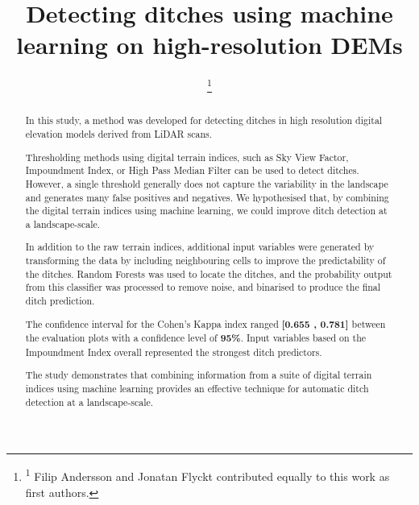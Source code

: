 \documentclass[]{interact}
\theoremstyle{plain}%
\theoremstyle{definition}
\theoremstyle{remark}
\begin{document}
\title{Detecting ditches using machine learning on high-resolution DEMs}

\author{
 
\footnote{\textsuperscript{1} Filip Andersson and Jonatan Flyckt contributed equally to this work as first authors.}}

\maketitle

\begin{abstract}
In this study, a method was developed for detecting ditches in high resolution digital elevation models derived from LiDAR scans.

Thresholding methods using digital terrain indices, such as Sky View Factor, Impoundment Index, or High Pass Median Filter can be used to detect ditches. However, a single threshold generally does not capture the variability in the landscape and generates many false positives and negatives. We hypothesised that, by combining the digital terrain indices using machine learning, we could improve ditch detection at a landscape-scale.

In addition to the raw terrain indices, additional input variables were generated by transforming the data by including neighbouring cells to improve the predictability of the ditches. Random Forests was used to locate the ditches, and the probability output from this classifier was processed to remove noise, and binarised to produce the final ditch prediction.

The confidence interval for the Cohen's Kappa index ranged \textbf{[0.655 , 0.781]} between the evaluation plots with a confidence level of \textbf{95\%}. Input variables based on the Impoundment Index overall represented the strongest ditch predictors.

The study demonstrates that combining information from  a suite of digital terrain indices using machine learning provides an effective technique for automatic ditch detection at a landscape-scale.
\end{abstract}
\end{document}

